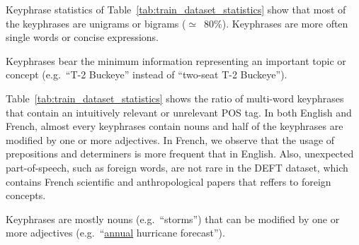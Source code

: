     Keyphrase statistics of Table~\ref{tab:train_dataset_statistics} show that
    most of the keyphrases are unigrams or bigrams ($\simeq$~$80\%$). Keyphrases
    are more often single words or concise expressions.
    
    \begin{property}\label{prop:informativity}
      Keyphrases bear the minimum information representing an important topic or
      concept (e.g.~``T-2 Buckeye'' instead of ``two-seat T-2 Buckeye'').
    \end{property}

    Table~\ref{tab:train_dataset_statistics} shows the ratio of multi-word
    keyphrases that contain an intuitively relevant or unrelevant POS tag. In
    both English and French, almost every keyphrases contain nouns and half of
    the keyphrases are modified by one or more adjectives. In French, we observe
    that the usage of prepositions and determiners is more frequent that in
    English. Also, unexpected part-of-speech, such as foreign words, are not
    rare in the DEFT dataset, which contains French scientific and
    anthropological papers that reffers to foreign concepts.

    \begin{property}\label{prop:noun_phrases}
      Keyphrases are mostly nouns (e.g.~``storms'') that can be modified by one
      or more adjectives (e.g.~``\underline{annual} hurricane forecast'').
    \end{property}

